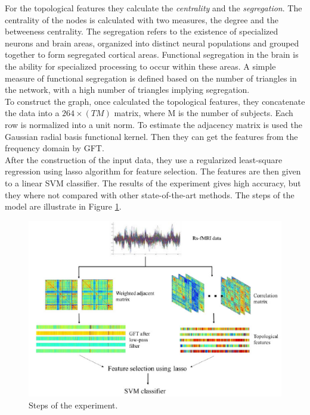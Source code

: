 For the topological features they calculate the \textit{centrality} and the \textit{segregation}. The centrality of the nodes is calculated with two measures, the degree and the betweeness centrality. The segregation refers to the existence of specialized neurons and brain areas, organized into distinct neural populations and grouped together to form segregated cortical areas. Functional segregation in the brain is the ability for specialized processing to occur within these areas. A simple measure of functional segregation is defined based on the number of triangles in the network, with a high number of triangles implying segregation.
\\

To construct the graph, once calculated the topological features, they concatenate the data into a $ 264 \times (TM) $ matrix, where M is the number of subjects. Each row is normalized into a unit norm. To estimate the adjacency matrix is used the Gaussian radial basis functional kernel. Then they can get the features from the frequency domain by GFT. 
\\

After the construction of the input data, they use a regularized least-square regression using lasso algorithm for feature selection. The features are then given to a linear SVM classifier. The results of the experiment gives high accuracy, but they where not compared with other state-of-the-art methods. The steps of the model are illustrate in Figure \ref{fig:diagram16}.

\begin{figure}[htbp]
	\centering
	\includegraphics[scale=0.8]{Immagini/integration.PNG}
	\caption{Steps of the experiment.}
	\label{fig:diagram16}
\end{figure}

